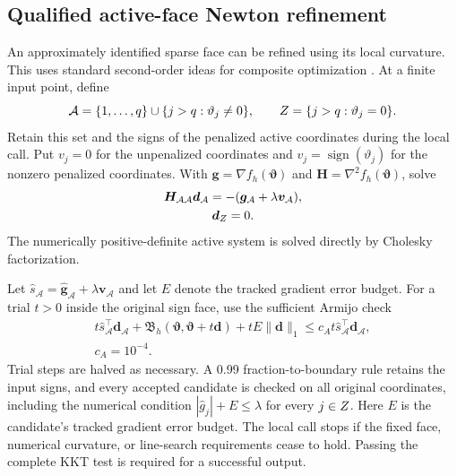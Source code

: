\subsection{Qualified active-face Newton refinement}
\label{subsec:active-refinement}
An approximately identified sparse face can be refined using its local curvature. This uses standard second-order ideas for composite optimization \citep{Lee2014}. At a finite input point, define
\[
 \mathcal A=\{1,\ldots,q\}\cup\{j>q:\vartheta_j\ne0\},
 \qquad \mathcal \bm{Z}=\{j>q:\vartheta_j=0\}.
\]
Retain this set and the signs of the penalized active coordinates during the local call. Put $v_j=0$ for the unpenalized coordinates and $v_j=\operatorname{sign}(\vartheta_j)$ for the nonzero penalized coordinates. With $\bm{g}=\nabla f_h(\bm{\vartheta})$ and $\bm{H}=\nabla^2f_h(\bm{\vartheta})$, solve
\begin{equation}
 \begin{gathered}
\bm{H}_{\mathcal A\mathcal A}\bm{d}_{\mathcal A}
       =-(\bm{g}_{\mathcal A}+\lambda \bm{v}_{\mathcal A}),
 \\
 \bm{d}_{\mathcal \bm{Z}}=0.
 \end{gathered}
 \label{eq:integrated-face-newton}
\end{equation}
The numerically positive-definite active system is solved directly by Cholesky factorization.

Let $\widehat s_{\mathcal A}=\widehat{\bm{g}}_{\mathcal A}+\lambda \bm{v}_{\mathcal A}$ and let $E$ denote the tracked gradient error budget. For a trial $t>0$ inside the original sign face, use the sufficient Armijo check
\begin{equation}
 \begin{gathered}
t\widehat s_{\mathcal A}^{\top}\bm{d}_{\mathcal A}
 +\mathfrak B_h(\bm{\vartheta},\bm{\vartheta}+t\bm{d})
 +tE\|\bm{d}\|_1
 \le c_A t\widehat s_{\mathcal A}^{\top}\bm{d}_{\mathcal A},
 \\
 c_A=10^{-4}.
 \end{gathered}
 \label{eq:integrated-face-armijo}
\end{equation}
Trial steps are halved as necessary. A 0.99 fraction-to-boundary rule retains the input signs, and every accepted candidate is checked on all original coordinates, including the numerical condition $|\widehat g_j|+E\le\lambda$ for every $j\in\mathcal \bm{Z}$. Here $E$ is the candidate's tracked gradient error budget. The local call stops if the fixed face, numerical curvature, or line-search requirements cease to hold. Passing the complete KKT test is required for a successful output.

